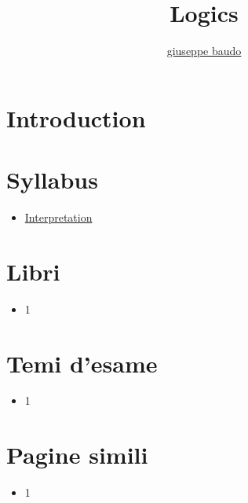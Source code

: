 \documentclass[a4paper,10pt]{article}
\title{Logics}
\author{\href{http://www.baudo.hol.es}{giuseppe baudo}}
\begin{document}
\maketitle

\section{Introduction}

\section{Syllabus}
\begin{itemize}
 \item \href{./Interpretation.html}{Interpretation}
\end{itemize}

\section{Libri}
  \begin{itemize}
   \item 1
  \end{itemize}

\section{Temi d'esame}
  \begin{itemize}
   \item 1
  \end{itemize}

\section{Pagine simili}
\begin{itemize}
  \item 1
\end{itemize}
\end{document}
